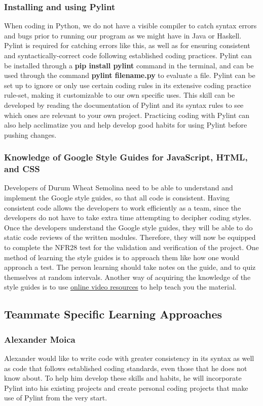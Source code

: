 \documentclass[12pt, titlepage]{article}
\begin{document}
	\subsubsection*{Installing and using Pylint}
	When coding in Python, we do not have a visible compiler to catch syntax errors and bugs prior to running our program as we might have in Java or Haskell. Pylint is required for catching errors like this, as well as for ensuring consistent and syntactically-correct code following established coding practices. Pylint can be installed through a \textbf{pip install pylint} command in the terminal, and can be used through the command \textbf{pylint filename.py} to evaluate a file. Pylint can be set up to ignore or only use certain coding rules in its extensive coding practice rule-set, making it customizable to our own specific uses. This skill can be developed by reading the documentation of Pylint and its syntax rules to see which ones are relevant to your own project. Practicing coding with Pylint can also help acclimatize you and help develop good habits for using Pylint before pushing changes.
	
	\subsubsection*{Knowledge of Google Style Guides for JavaScript, HTML, and CSS}
	Developers of Durum Wheat Semolina need to be able to understand and implement the Google style guides, so that all code is consistent. Having consistent code allows the developers to work efficiently as a team, since the developers do not have to take extra time attempting to decipher coding styles. Once the developers understand the Google style guides, they will be able to do static code reviews of the written modules. Therefore, they will now be equipped to complete the NFR28 test for the validation and verification of the project. One method of learning the style guides is to approach them like how one would approach a test. The person learning should take notes on the guide, and to quiz themselves at random intervals. Another way of acquiring the knowledge of the style guides is to use \href{https://www.youtube.com/watch?v=RFFsT5YQuSQ}{online video resources} to help teach you the material.
	
	\subsection*{Teammate Specific Learning Approaches}
	\subsubsection*{Alexander Moica}
	Alexander would like to write code with greater consistency in its syntax as well as code that follows established coding standards, even those that he does not know about. To help him develop these skills and habits, he will incorporate Pylint into his existing projects and create personal coding projects that make use of Pylint from the very start.
	
\end{document}
